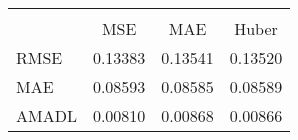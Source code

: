 \begin{tabular}{lccc}
\hline\hline \\ [-1.8ex]
 & MSE & MAE & Huber \\ 
 \hline 
RMSE & 0.13383 & 0.13541 & 0.13520 \\ 
MAE & 0.08593 & 0.08585 & 0.08589 \\ 
AMADL & 0.00810 & 0.00868 & 0.00866 \\ 
\hline\hline
\end{tabular}